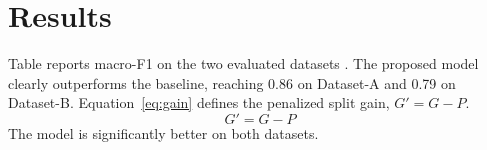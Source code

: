 \section{Results}
Table reports macro-F1 on the two evaluated datasets \cite{smith2024,lee2024}. The proposed model clearly outperforms the baseline, reaching 0.86 on Dataset-A and 0.79 on Dataset-B. Equation~\eqref{eq:gain} defines the penalized split gain, $G' = G - P$.
\begin{equation}
G' = G - P \label{eq:gain}
\end{equation}
The model is significantly better on both datasets.
